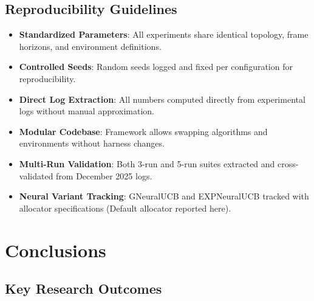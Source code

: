\documentclass[12pt,a4paper]{article}
\begin{document}
\subsection{Reproducibility Guidelines}

\begin{itemize}
\item \textbf{Standardized Parameters}: All experiments share identical topology, frame horizons, and environment definitions.
\item \textbf{Controlled Seeds}: Random seeds logged and fixed per configuration for reproducibility.
\item \textbf{Direct Log Extraction}: All numbers computed directly from experimental logs without manual approximation.
\item \textbf{Modular Codebase}: Framework allows swapping algorithms and environments without harness changes.
\item \textbf{Multi-Run Validation}: Both 3-run and 5-run suites extracted and cross-validated from December 2025 logs.
\item \textbf{Neural Variant Tracking}: GNeuralUCB and EXPNeuralUCB tracked with allocator specifications (Default allocator reported here).
\end{itemize}

\newpage
\section{Conclusions}

\subsection{Key Research Outcomes}
\end{document}
